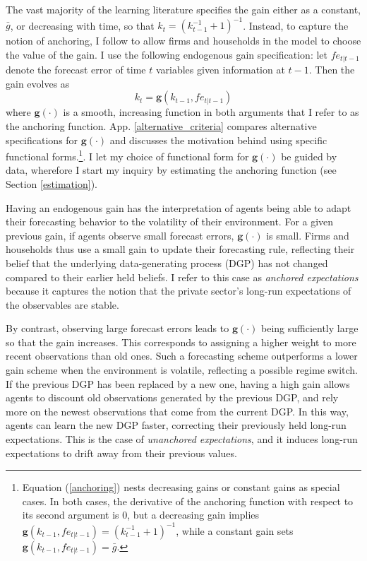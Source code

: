 \documentclass[11pt]{article}
\renewcommand{\[}{\begin{equation}}
\renewcommand{\]}{\end{equation}}
\begin{document}
The vast majority of the learning literature specifies the gain either as a constant, $\bar{g}$, or decreasing with time, so that $k_t = (k_{t-1}^{-1}+1)^{-1}$. Instead, to capture the notion of anchoring, I follow \cite{carvalho2019anchored} to allow firms and households in the model to choose the value of the gain. I use the following endogenous gain specification: let $fe_{t|t-1}$ denote the forecast error of time $t$ variables given information at $t-1$. Then the gain evolves as
\begin{equation}
k_t  = \mathbf{g}(k_{t-1},fe_{t|t-1}) 
\label{anchoring}
\end{equation}
where $\mathbf{g(\cdot)}$ is a smooth, increasing function in both arguments that I refer to as the anchoring function. App. \ref{alternative_criteria} compares alternative specifications for $\mathbf{g(\cdot)}$ and discusses the motivation behind using specific functional forms.\footnote{Equation (\ref{anchoring}) nests decreasing gains or constant gains as special cases. In both cases, the derivative of the anchoring function with respect to its second argument is 0, but a decreasing gain implies $\mathbf{g}(k_{t-1},fe_{t|t-1})  = (k_{t-1}^{-1}+1)^{-1}$, while a constant gain sets $\mathbf{g}(k_{t-1},fe_{t|t-1})  = \bar{g}$.}. I let my choice of functional form for $\mathbf{g(\cdot)}$ be guided by data, wherefore I start my inquiry by estimating the anchoring function (see Section \ref{estimation}).

Having an endogenous gain has the interpretation of agents being able to adapt their forecasting behavior to the volatility of their environment. For a given previous gain, if agents observe small forecast errors, $\mathbf{g(\cdot)}$ is small. Firms and households thus use a small gain to update their forecasting rule, reflecting their belief that the underlying data-generating process (DGP) has not changed compared to their earlier held beliefs. I refer to this case as \emph{anchored expectations} because it captures the notion that the private sector's long-run expectations of the observables are stable. 

By contrast, observing large forecast errors leads to $\mathbf{g}(\cdot)$ being sufficiently large so that the gain increases. This corresponds to assigning a higher weight to more recent observations than old ones. Such a forecasting scheme outperforms a lower gain scheme when the environment is volatile, reflecting a possible regime switch. If the previous DGP has been replaced by a new one, having a high gain allows agents to discount old observations generated by the previous DGP, and rely more on the newest observations that come from the current DGP. In this way, agents can learn the new DGP faster, correcting their previously held long-run expectations. This is the case of \emph{unanchored expectations}, and it induces long-run expectations to drift away from their previous values. 
\end{document}
